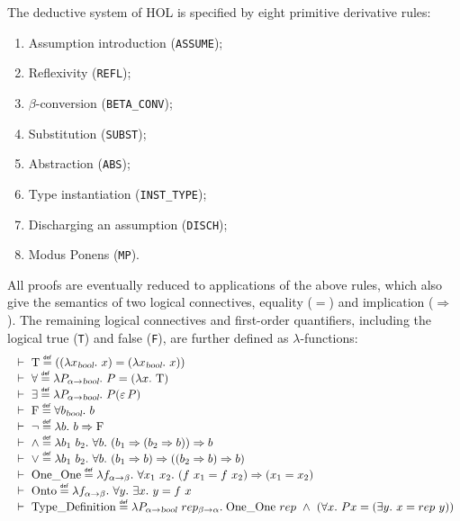 \documentclass[GCNS]{yincog}
\renewcommand{\HOLinline}[1]{\mbox{\textup{\texttt{#1}}}}
\renewcommand{\HOLConst}[1]{\texttt{#1}}
\renewcommand{\HOLTokenDefEquality}{\ensuremath{\mathrel{\overset{\makebox [0pt]{\text{\tiny \textsf{def}}}}{=}}}}
\theoremstyle{remark}
\theoremstyle{theorem}
\theoremstyle{remark}
\newcommand{\Tvtex}{\mathcal{T}}
\newcommand\fun{{\to}}
\newcommand{\tyvtex}[1]{\textsl{#1}}
\newcommand\imp{ \Rightarrow }
\newcommand\turn{\ \vdash\ }
\newcommand\hilbert{\varepsilon}
\newcommand{\uquant}[1]{\forall #1.\ }
\newcommand{\equant}[1]{\exists #1.\ }
\newcommand{\lquant}[1]{\lambda #1.\ }
\newcommand{\con}[1]{\mathrm{#1}}
\renewcommand{\Tvtex}{\con{T}}
\newcommand\Fvtex{\con{F}}
\newcommand\OneOne{\con{One\_One}}
\newcommand\Onto{\con{Onto}}
\newcommand\TyDef{\con{Type\_Definition}}
\begin{document}
The deductive system of HOL is specified by eight primitive derivative
rules:
%
\begin{enumerate}
%
\item Assumption introduction (\texttt{ASSUME});
%
\item Reflexivity (\texttt{REFL});
%
\item $\beta $-conversion (\texttt{BETA\_CONV});
%
\item Substitution (\texttt{SUBST});
%
\item Abstraction (\texttt{ABS});
%
\item Type instantiation (\texttt{INST\_TYPE});
%
\item Discharging an assumption (\texttt{DISCH});
%
\item Modus Ponens (\texttt{MP}).
%
\end{enumerate}
%
All proofs are eventually reduced to applications of the above rules, which
also give the semantics of two  logical connectives, equality
($=$) and implication ($\Rightarrow $). The remaining logical connectives
and first-order quantifiers, including the logical true (\HOLinline{\HOLConst{T}})
and false (\HOLinline{\HOLConst{F}}), are further defined as
$\lambda $-functions:
%
\begin{equation*}
%
\begin{array}{l}
\turn \Tvtex \HOLTokenDefEquality ((\lquant{x_{\tyvtex{bool}}}x) = (
\lquant{x_{\tyvtex{bool}}}x))
\\
\turn \forall \HOLTokenDefEquality
\lquant{P_{\alpha \fun \tyvtex{bool}}} P = (\lquant{x}\Tvtex )
\\
\turn \exists \HOLTokenDefEquality
\lquant{P_{\alpha \fun \tyvtex{bool}}} P({\hilbert}\, P)
\\
\turn \Fvtex \HOLTokenDefEquality \uquant{b_{\tyvtex{bool}}} b
\\
\turn \neg \HOLTokenDefEquality \lquant{b} b \imp \Fvtex
\\
\turn {\wedge} \HOLTokenDefEquality \lquant{b_1\ b_2}\uquant{b} (b_1
\imp (b_2 \imp b)) \imp b
\\
\turn {\vee} \HOLTokenDefEquality \lquant{b_1\ b_2}\uquant{b} (b_1
\imp b)\imp ((b_2 \imp b) \imp b)
\\
\turn \OneOne \HOLTokenDefEquality \lquant{f_{\alpha \fun \beta}}
\uquant{x_1\ x_2} (f\ x_1 = f\ x_2) \imp (x_1 = x_2)
\\
\turn \Onto \HOLTokenDefEquality \lquant{f_{\alpha \fun \beta}}
\uquant{y}\equant{x} y = f\ x
\\
\turn \TyDef \HOLTokenDefEquality \lambda P_{\alpha \fun
\tyvtex{bool}}\
 rep_{\beta \fun \alpha}.\; \OneOne \ rep \ \wedge{}\  (\uquant{x}P x =
(\equant{y} x = rep\ y))
\end{array}
%
\end{equation*}
\end{document}
